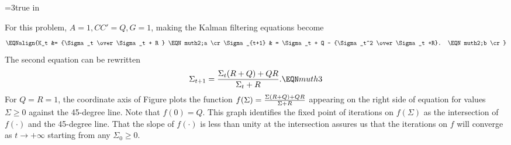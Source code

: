 
\centerline{\epsfxsize=3true in}
\caption{Graph of $f(\Sigma) = {
 {\Sigma(R+Q) + Q R} \over \Sigma + R }$ against $\Sigma$ when  $Q= R=1$.  The 45-degree
line is also plotted. Iterations on the Riccati equation for $\Sigma_t$ converge
to the intersection.}
\endfigure





  For this problem,  $A=1, CC'=Q, G=1$, making the Kalman filtering
 equations  become
$$\EQNalign{K_t &= {\Sigma_t   \over \Sigma_t + R } \EQN muth2;a \cr
            \Sigma_{t+1} & = \Sigma_t + Q - {\Sigma_t^2 \over
                            \Sigma_t +R}. \EQN muth2;b \cr }$$
The second equation can be rewritten
$$ \Sigma_{t+1} = { \Sigma_t(R+Q) + Q R \over \Sigma_t + R }. \EQN muth3$$
For $Q=R=1$, the coordinate axis of Figure  plots the function
$f(\Sigma)
 = {\Sigma(R+Q) + Q R \over \Sigma + R }$ appearing on the right side
of equation  for values $\Sigma \geq 0$ against the
45-degree line. Note that $f(0) = Q$.
This graph identifies the fixed point of iterations on
$f(\Sigma)$ as the intersection of $f(\cdot)$ and the 45-degree line.
That the slope of $f(\cdot)$ is less than unity at the intersection
assures us that the iterations on $f$ will converge as $t \rightarrow
+\infty$ starting from any $\Sigma_0 \geq 0$.
%

